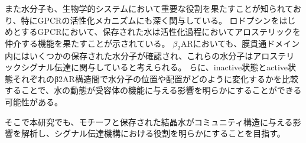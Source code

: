 また水分子も、生物学的システムにおいて重要な役割を果たすことが知られており、特にGPCRの活性化メカニズムにも深く関与している。
ロドプシンをはじめとするGPCRにおいて、保存された水は活性化過程においてアロステリックを仲介する機能を果たすことが示されている\cite{angel2009conserved}。
$\beta_2$ARにおいても、膜貫通ドメイン内にはいくつかの保存された水分子が確認され、これらの水分子はアロステリックシグナル伝達に関与していると考えられる。
らに、inactive状態とactive状態それぞれのβ2AR構造間で水分子の位置や配置がどのように変化するかを比較することで、水の動態が受容体の機能に与える影響を明らかにすることができる可能性がある。

そこで本研究でも、モチーフと保存された結晶水がコミュニティ構造に与える影響を解析し、シグナル伝達機構における役割を明らかにすることを目指す。
